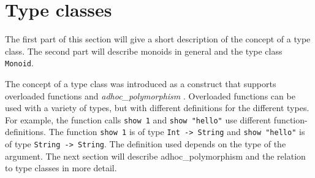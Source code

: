 \section{Type classes}
\label{sec:typeclasses}

The first part of this section will give a short description of the concept of a type class. The second part will describe monoids in general and the type class \verb|Monoid|.

The concept of a type class was introduced as a construct that supports overloaded functions and \emph{\gls{adhoc_polymorphism}} \cite{Wadler}. Overloaded functions can be used with a variety of types, but with different definitions for the different types. For example, the function calls \verb|show 1| and \verb|show "hello"| use different \glspl{function-definition}. The function \verb|show 1| is of type \verb|Int -> String| and \verb|show "hello"| is of type \verb|String -> String|. The definition used depends on the type of the argument.  The next section will describe \gls{adhoc_polymorphism} and the relation to type classes in more detail.

